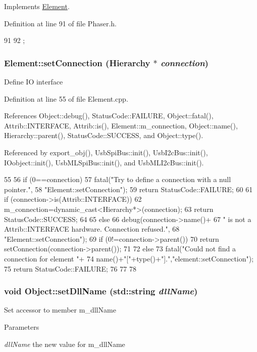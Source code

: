 Implements \hyperlink{classElement_a69efffa22f06909d768149715565cb56}{Element}.

Definition at line 91 of file Phaser.h.


\begin{DoxyCode}
91                {
92   };
\end{DoxyCode}
\hypertarget{classElement_ab476b4b1df5954141ceb14f072433b89}{
\subsubsection[{setConnection}]{ Element::setConnection ({\bf Hierarchy} $\ast$ {\em connection})}}
\label{classElement_ab476b4b1df5954141ceb14f072433b89}
Define IO interface 

Definition at line 55 of file Element.cpp.

References Object::debug(), StatusCode::FAILURE, Object::fatal(), Attrib::INTERFACE, Attrib::is(), Element::m\_\-connection, Object::name(), Hierarchy::parent(), StatusCode::SUCCESS, and Object::type().

Referenced by export\_\-obj(), UsbSpiBus::init(), UsbI2cBus::init(), IOobject::init(), UsbMLSpiBus::init(), and UsbMLI2cBus::init().


\begin{DoxyCode}
55                                                       {
56   if (0==connection){
57     fatal("Try to define a connection with a null pointer.",
58         "Element::setConnection");
59     return StatusCode::FAILURE;
60   }
61   if (connection->is(Attrib::INTERFACE)){
62     m_connection=dynamic_cast<Hierarchy*>(connection);
63     return StatusCode::SUCCESS;
64   }
65   else {
66     debug(connection->name()+
67         " is not a Attrib::INTERFACE hardware. Connection refused.",
68         "Element::setConnection");
69     if (0!=connection->parent()){
70       return setConnection(connection->parent());
71     }
72     else{
73       fatal("Could not find a connection for element "+
74           name()+"["+type()+"].","element::setConnection");
75       return StatusCode::FAILURE;
76     }
77   }
78 }
\end{DoxyCode}
\hypertarget{classObject_a870c5af919958c2136623b2d7816d123}{
\subsubsection[{setDllName}]{\setlength{\rightskip}{0pt plus 5cm}void Object::setDllName (std::string {\em dllName})}}
\label{classObject_a870c5af919958c2136623b2d7816d123}
Set accessor to member m\_\-dllName 
\begin{DoxyParams}{Parameters}
\item[{\em dllName}]the new value for m\_\-dllName \end{DoxyParams}


